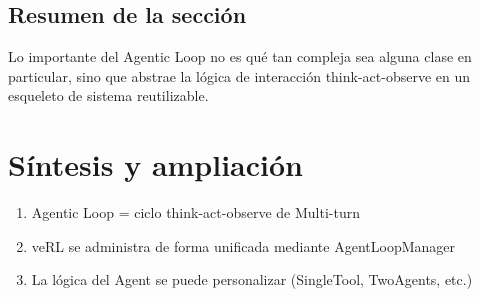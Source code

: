 \documentclass[a4paper]{article}
\begin{document}
\subsection{Resumen de la sección}
Lo importante del Agentic Loop no es qué tan compleja sea alguna clase en particular, sino que abstrae la lógica de interacción think-act-observe en un esqueleto de sistema reutilizable.

\newpage
\section{Síntesis y ampliación}
\begin{enumerate}
  \item Agentic Loop = ciclo think-act-observe de Multi-turn
  \item veRL se administra de forma unificada mediante AgentLoopManager
  \item La lógica del Agent se puede personalizar (SingleTool, TwoAgents, etc.)
\end{enumerate}
\end{document}
